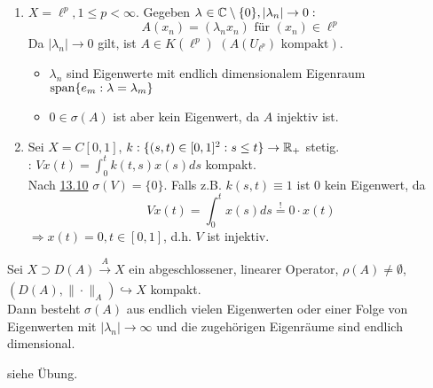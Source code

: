 \begin{beispiel}
	\begin{enumerate}[label=\alph*\upshape)]
		\item $X = \ell^{p}, 1 \leq p < \infty$. Gegeben $\lambda_{} \in \mathbb{C} \setminus \{ 0 \}, | \lambda_{n} | \rightarrow 0:$
			\[ A(x_{n}) = (\lambda_{n} x_{n}) \text{ für } (x_{n}) \in \ell^{p} \]
			Da $| \lambda_{n} | \rightarrow 0$ gilt, ist $A \in K(\ell^{p})$ $\left( A \left( U_{\ell^{p}} \right) \text{ kompakt} \right)$.
			\begin{itemize}
				\item $\lambda_{n}$  sind Eigenwerte mit endlich dimensionalem Eigenraum $\operatorname{span}\{ e_{m}: \lambda = \lambda_{m} \}$
				\item $0 \in \sigma(A)$ ist aber kein Eigenwert, da $A$ injektiv ist. 
			\end{itemize}
		\item Sei $X = C[0, 1]$, $k: \{ (s, t) \in [0, 1]^{2}: s \leq t \} \rightarrow \mathbb{R}_{+}$ stetig. \\
			: $V x(t) = \int_{0}^{t} k(t, s) x(s) ds$ kompakt. \\
			Nach \hyperref[bsp:13.10]{13.10} $\sigma(V) = \{ 0 \}$.
			Falls z.B. $k(s, t) \equiv 1$ ist $0$ kein Eigenwert, da 
			\[ V x(t) = \int_{0}^{t} x(s) ds \overset{!}{=} 0 \cdot x(t) \]
			$\Rightarrow x(t) = 0, t \in [0, 1]$, d.h. $V$ ist injektiv.
	\end{enumerate}	
\end{beispiel}


\begin{satz}
	Sei $X \supset D(A) \xrightarrow[]{A} X$ ein abgeschlossener, linearer Operator, $\rho(A) \neq \emptyset$, $(D(A), \| \cdot \|_{A}) \hookrightarrow X$ kompakt. \\
	Dann besteht $\sigma(A)$ aus endlich vielen Eigenwerten oder einer Folge von Eigenwerten mit $|\lambda_{n}| \rightarrow \infty$ und die zugehörigen Eigenräume sind endlich dimensional.
\end{satz}

\begin{beweis}
	siehe Übung.	
\end{beweis}



\newpage